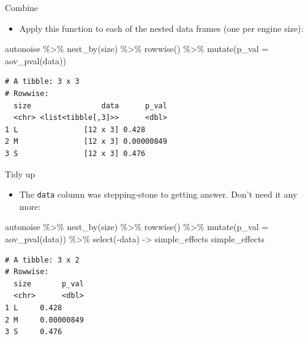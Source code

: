 \documentclass[
  ignorenonframetext,
]{beamer}
\newenvironment{Shaded}{\begin{snugshade}}{\end{snugshade}}
\newcommand{\AttributeTok}[1]{\textcolor[rgb]{0.40,0.45,0.13}{#1}}
\newcommand{\FunctionTok}[1]{\textcolor[rgb]{0.28,0.35,0.67}{#1}}
\newcommand{\NormalTok}[1]{\textcolor[rgb]{0.00,0.23,0.31}{#1}}
\newcommand{\OtherTok}[1]{\textcolor[rgb]{0.00,0.23,0.31}{#1}}
\newcommand{\SpecialCharTok}[1]{\textcolor[rgb]{0.37,0.37,0.37}{#1}}
\providecommand{\tightlist}{%
  \setlength{\itemsep}{0pt}\setlength{\parskip}{0pt}}\usepackage{longtable,booktabs,array}
\begin{document}
\begin{frame}[fragile]{Combine}
\protect\hypertarget{combine}{}
\begin{itemize}
\tightlist
\item
  Apply this function to each of the nested data frames (one per engine
  size):
\end{itemize}

\begin{Shaded}
\begin{Highlighting}[]
\NormalTok{autonoise }\SpecialCharTok{\%\textgreater{}\%}
  \FunctionTok{nest\_by}\NormalTok{(size) }\SpecialCharTok{\%\textgreater{}\%} 
  \FunctionTok{rowwise}\NormalTok{() }\SpecialCharTok{\%\textgreater{}\%} 
  \FunctionTok{mutate}\NormalTok{(}\AttributeTok{p\_val =} \FunctionTok{aov\_pval}\NormalTok{(data))}
\end{Highlighting}
\end{Shaded}

\begin{verbatim}
# A tibble: 3 x 3
# Rowwise: 
  size                data      p_val
  <chr> <list<tibble[,3]>>      <dbl>
1 L               [12 x 3] 0.428     
2 M               [12 x 3] 0.00000849
3 S               [12 x 3] 0.476     
\end{verbatim}
\end{frame}

\begin{frame}[fragile]{Tidy up}
\protect\hypertarget{tidy-up}{}
\begin{itemize}
\tightlist
\item
  The \texttt{data} column was stepping-stone to getting answer. Don't
  need it any more:
\end{itemize}

\small

\begin{Shaded}
\begin{Highlighting}[]
\NormalTok{autonoise }\SpecialCharTok{\%\textgreater{}\%}
  \FunctionTok{nest\_by}\NormalTok{(size) }\SpecialCharTok{\%\textgreater{}\%} 
  \FunctionTok{rowwise}\NormalTok{() }\SpecialCharTok{\%\textgreater{}\%} 
  \FunctionTok{mutate}\NormalTok{(}\AttributeTok{p\_val =} \FunctionTok{aov\_pval}\NormalTok{(data)) }\SpecialCharTok{\%\textgreater{}\%} 
  \FunctionTok{select}\NormalTok{(}\SpecialCharTok{{-}}\NormalTok{data) }\OtherTok{{-}\textgreater{}}\NormalTok{ simple\_effects}
\NormalTok{simple\_effects}
\end{Highlighting}
\end{Shaded}

\begin{verbatim}
# A tibble: 3 x 2
# Rowwise: 
  size       p_val
  <chr>      <dbl>
1 L     0.428     
2 M     0.00000849
3 S     0.476     
\end{verbatim}

\normalsize
\end{frame}
\end{document}
